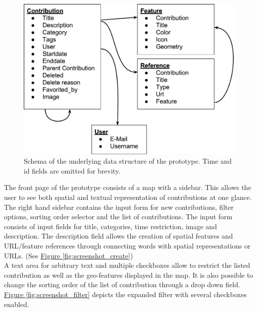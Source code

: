 \begin{figure}[!h]
    \centering
    \includegraphics[width=1\columnwidth]{images/data_structure}
    \caption{Schema of the underlying data structure of the prototype. Time and id fields are omitted for brevity.}
    \label{fig:data_structure}
\end{figure}

The front page of the prototype consists of a map with a sidebar. This allows the user to see both spatial and textual representation of contributions at one glance. The right hand sidebar contains the input form for new contributions, filter options, sorting order selector and the list of contributions. The input form consists of input fields for title, categories, time restriction, image and description. The description field allows the creation of spatial features and URL/feature references through connecting words with spatial representations or URLs. (See \hyperref[fig:screenshot_create]{Figure \ref{fig:screenshot_create}})\\
A text area for arbitrary text and multiple checkboxes allow to restrict the listed contribution as well as the geo-features displayed in the map. It is also possible to change the sorting order of the list of contribution through a drop down field. \hyperref[fig:screenshot_filter]{Figure \ref{fig:screenshot_filter}} depicts the expanded filter with several checkboxes enabled.

